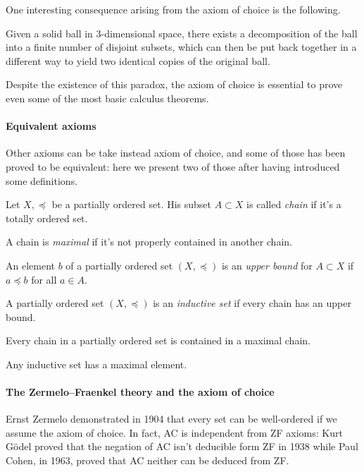 One interesting consequence arising from the axiom of choice is the following.
\begin{prop}
	Given a solid ball in 3-dimensional space, there exists a decomposition of the ball into a finite number of disjoint subsets, which can then be put back together in a different way to yield two identical copies of the original ball.
\end{prop}

Despite the existence of this paradox, the axiom of choice is essential to prove even some of the most basic calculus theorems.

\paragraph{Equivalent axioms} Other axioms can be take instead axiom of choice, and some of those has been proved to be equivalent: here we present two of those after having introduced some definitions.

\begin{defn}\label{chain-defn}
	Let $X, \preceq$ be a partially ordered set. His subset $A \subset X$ is called \emph{chain} if it's a totally ordered set.
	
	A chain is \emph{maximal} if it's not properly contained in another chain.
	
	An element $b$ of a partially ordered set $(X, \preceq)$ is an \emph{upper bound} for $A \subset X$ if $a\preceq b$ for all $a \in A$.
	
	A partially ordered set $(X, \preceq)$ is an \emph{inductive set} if every chain has an upper bound.
\end{defn}

\begin{prop} 
	Every chain in a partially ordered set is contained in a maximal chain.
\end{prop}

\begin{prop}  \label{lemma-zorn}
	Any inductive set has a maximal element.
\end{prop}


\paragraph{The Zermelo--Fraenkel theory and the axiom of choice}  Ernst Zermelo demonstrated in 1904 that every set can be well-ordered if we assume the axiom of choice. In fact, AC is independent from ZF axioms:  Kurt Gödel proved that the negation of AC isn't deducible form ZF in 1938 while Paul Cohen, in 1963, proved that AC neither can be deduced from ZF.

